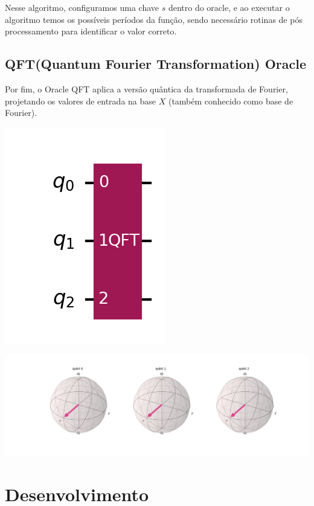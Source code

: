 \documentclass{article}
\begin{document}
Nesse algoritmo, configuramos uma chave $s$ dentro do oracle, e ao executar o algoritmo temos os possíveis períodos da função, sendo necessário rotinas de pós processamento para identificar o valor correto.

\subsection{QFT(Quantum Fourier Transformation) Oracle}

Por fim, o Oracle QFT aplica a versão quântica da transformada de Fourier, projetando os valores de entrada na base $X$ (também conhecido como base de Fourier).


\begin{center}
	\includegraphics[scale=0.4]{QFT_1.png}
	\label{fig:QFT}
\end{center}

\begin{center}
	\includegraphics[scale=0.3]{QFT_1_bloch.png}
	\label{fig:QFT-bloch}
\end{center}


\section{Desenvolvimento}
\end{document}
